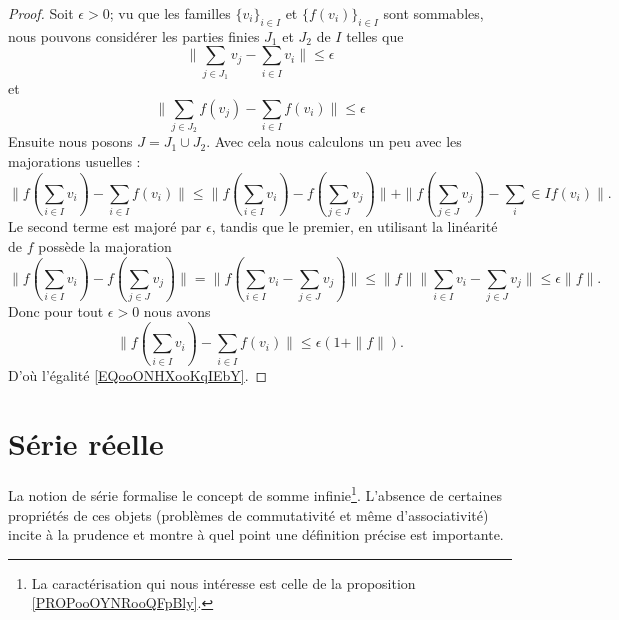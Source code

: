 \begin{proof}
	Soit \( \epsilon>0\); vu que les familles \( \{ v_i \}_{i\in I}\) et \( \{ f(v_i) \}_{i\in I}\) sont sommables, nous pouvons considérer les parties finies \( J_1\) et \( J_2\) de \( I\) telles que
	\begin{equation}
		\big\| \sum_{j\in J_1}v_j-\sum_{i\in I}v_i \big\|\leq \epsilon
	\end{equation}
	et
	\begin{equation}
		\big\| \sum_{j\in J_2}f(v_j)-\sum_{i\in I}f(v_i) \big\|\leq \epsilon
	\end{equation}
	Ensuite nous posons \( J=J_1\cup J_2\). Avec cela nous calculons un peu avec les majorations usuelles :
	\begin{equation}
		\| f(\sum_{i\in I}v_i) -\sum_{i\in I}f(v_i) \|\leq \| f(\sum_{i\in I}v_i)- f(\sum_{j\in J}v_j) \|+  \| f(\sum_{j\in J}v_j)-\sum_i\in If(v_i) \|.
	\end{equation}
	Le second terme est majoré par \( \epsilon\), tandis que le premier, en utilisant la linéarité de \( f\) possède la majoration
	\begin{equation}
		\| f(\sum_{i\in I}v_i)- f(\sum_{j\in J}v_j) \|=\| f(\sum_{i\in I}v_i-\sum_{j\in J}v_j) \|\leq \| f \| \| \sum_{i\in I}v_i- \sum_{j\in J}v_j\|\leq \epsilon\| f \|.
	\end{equation}
	Donc pour tout \( \epsilon>0\) nous avons
	\begin{equation}
		\| f(\sum_{i\in I}v_i) -\sum_{i\in I}f(v_i) \|\leq \epsilon(1+\| f \|).
	\end{equation}
	D'où l'égalité \eqref{EQooONHXooKqIEbY}.
\end{proof}


\section{Série réelle}
\label{secseries}

La notion de série formalise le concept de somme infinie\footnote{La caractérisation qui nous intéresse est celle de la proposition \ref{PROPooOYNRooQFpBly}.}. L'absence de certaines propriétés de ces objets (problèmes de commutativité et même d'associativité) incite à la prudence et montre à quel point une définition précise est importante.


